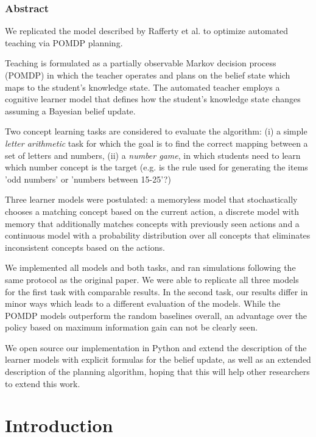 
\subsubsection{Abstract}
We replicated the model described by Rafferty et al. to optimize automated teaching via POMDP planning. 

Teaching is formulated as a partially observable Markov decision process (POMDP) in which the teacher operates and plans on the belief state which maps to the student's knowledge state.
The automated teacher employs a cognitive learner model that defines how the student's knowledge state changes assuming a Bayesian belief update.

Two concept learning tasks are considered to evaluate the algorithm: (i) a simple \textit{letter arithmetic} task for which the goal is to find the correct mapping between a set of letters and numbers, (ii) a \textit{number game}, in which students need to learn which number concept is the target (e.g. is the rule used for generating the items 'odd numbers' or 'numbers between 15-25'?)

Three learner models were postulated: a memoryless model that stochastically chooses a matching concept based on the current action, a discrete model with memory that additionally matches concepts with previously seen actions and a continuous model with a probability distribution over all concepts that eliminates inconsistent concepts based on the actions.

We implemented all models and both tasks, and ran simulations following the same protocol as the original paper. We were able to replicate all three models for the first task with comparable results. In the second task, our results differ in minor ways which leads to a different evaluation of the models. %
While the POMDP models outperform the random baselines overall, an advantage over the policy based on maximum information gain can not be clearly seen.


We open source our implementation in Python and extend the description of the learner models with explicit formulas for the belief update, as well as an extended description of the planning algorithm, hoping that this will help other researchers to extend this work.

\section{Introduction}

